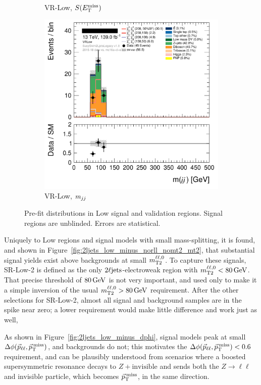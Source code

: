 \begin{figure}[tp]
\begin{subfigure}{0.495\textwidth}
\caption{VR-Low, $\metsig$}
\end{subfigure}
\hfill
\begin{subfigure}{0.495\textwidth}
\centering
\includegraphics[width=\textwidth]{figures/2ljets_def_mjj_VRLow.png}
\caption{VR-Low, $\mjj$}
\end{subfigure}
\caption[
Pre-fit distributions in Low signal and validation regions
]{%
Pre-fit distributions in Low signal and validation regions.
Signal regions are unblinded.
Errors are statistical.
}
\label{fig:2ljets_low_region}
\end{figure}

Uniquely to Low regions and signal models with small mass-splitting, it is
found, and shown in Figure~\ref{fig:2ljets_low_minus_norll_nomt2_mt2}, that
substantial signal yields exist above backgrounds at small $\mttwoll$.
To capture these signals, SR-Low-2 is defined as the only
$\twoljets$-electroweak region with $\mttwoll < 80\,\eV[G]$.
That precise threshold of $80\,\eV[G]$ is not very important, and used only to make it
a simple inversion of the usual $\mttwoll > 80\,\eV[G]$ requirement.
After the other selections for SR-Low-2, almost all signal and background
samples are in the spike near zero;
a lower requirement would make little difference and work just as well,

As shown in Figure~\ref{fig:2ljets_low_minus_dphi}, signal models peak at small
$\dphillmet$, and backgrounds do not; this motivates the $\dphillmet < 0.6$
requirement, and can be plausibly understood from scenarios where a boosted
supersymmetric resonance decays to $Z+\mathrm{invisible}$ and sends both
the $Z\to \ell\ell$ and invisible particle, which becomes
$\ptmiss$, in the same direction.

